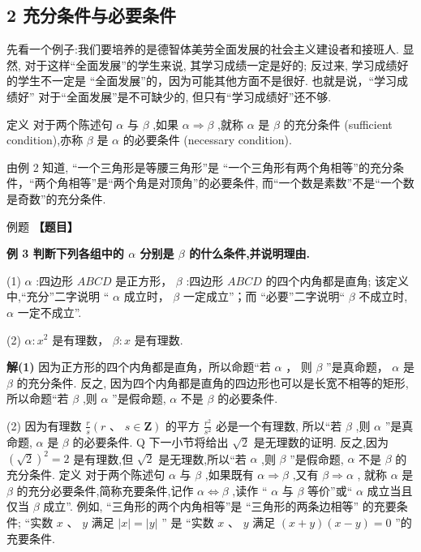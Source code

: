 \documentclass[a4paper,10pt,oneside,fontset=none]{ctexbook}
\newcounter{example}[chapter]
\newenvironment{example}[1][]{\begin{exBox}{例题}{#1}}{\end{exBox}}
\numberwithin{equation}{chapter}
\newenvironment{solution}{\begin{solutionBox}}{\end{solutionBox}}
\begin{document}
\subsection{2 充分条件与必要条件}

先看一个例子:我们要培养的是德智体美劳全面发展的社会主义建设者和接班人. 显然, 对于这样“全面发展”的学生来说, 其学习成绩一定是好的; 反过来, 学习成绩好的学生不一定是 “全面发展”的，因为可能其他方面不是很好. 也就是说，“学习成绩好” 对于“全面发展”是不可缺少的, 但只有“学习成绩好”还不够.

定义 对于两个陈述句 $\alpha$ 与 $\beta$ ,如果 $\alpha  \Rightarrow  \beta$ ,就称 $\alpha$ 是 $\beta$ 的充分条件 (sufficient condition),亦称 $\beta$ 是 $\alpha$ 的必要条件 (necessary condition).

由例 2 知道, “一个三角形是等腰三角形”是 “一个三角形有两个角相等”的充分条件，“两个角相等”是“两个角是对顶角”的必要条件, 而“一个数是素数”不是“一个数是奇数”的充分条件.

\begin{example}
\textbf{【题目】}\par\vspace{0.3em}
\textbf{例 3 判断下列各组中的 $\alpha$ 分别是 $\beta$ 的什么条件,并说明理由.}\par\vspace{0.3em}
\par
(1)  $\alpha$ :四边形 ${ABCD}$ 是正方形， $\beta$ :四边形 ${ABCD}$ 的四个内角都是直角;
该定义中,“充分”二字说明 “ $\alpha$ 成立时， $\beta$ 一定成立”；而 “必要”二字说明“ $\beta$ 不成立时, $\alpha$ 一定不成立”.
\par
(2)  $\alpha  : {x}^{2}$ 是有理数， $\beta  : x$ 是有理数.
\end{example}

\begin{solution}
\textbf{解(1)} 因为正方形的四个内角都是直角，所以命题“若 $\alpha$ ， 则 $\beta$ ”是真命题， $\alpha$ 是 $\beta$ 的充分条件.
反之, 因为四个内角都是直角的四边形也可以是长宽不相等的矩形,所以命题“若 $\beta$ ,则 $\alpha$ ”是假命题, $\alpha$ 不是 $\beta$ 的必要条件.
\par
(2) 因为有理数 $\frac{r}{s}\left( {r\text{ 、 }s \in  \mathbf{Z}}\right)$ 的平方 $\frac{{r}^{2}}{{s}^{2}}$ 必是一个有理数, 所以“若 $\beta$ ,则 $\alpha$ ”是真命题, $\alpha$ 是 $\beta$ 的必要条件. Q
下一小节将给出 $\sqrt{2}$ 是无理数的证明.
反之,因为 ${\left( \sqrt{2}\right) }^{2} = 2$ 是有理数,但 $\sqrt{2}$ 是无理数,所以“若 $\alpha$ ,则 $\beta$ ”是假命题, $\alpha$ 不是 $\beta$ 的充分条件.
定义 对于两个陈述句 $\alpha$ 与 $\beta$ ,如果既有 $\alpha  \Rightarrow  \beta$ ,又有 $\beta  \Rightarrow  \alpha$ , 就称 $\alpha$ 是 $\beta$ 的充分必要条件,简称充要条件,记作 $\alpha  \Leftrightarrow  \beta$ ,读作 “ $\alpha$ 与 $\beta$ 等价”或“ $\alpha$ 成立当且仅当 $\beta$ 成立”.
例如, “三角形的两个内角相等”是 “三角形的两条边相等” 的充要条件; “实数 $x\text{ 、 }y$ 满足 $\left| x\right|  = \left| y\right|$ ” 是 “实数 $x\text{ 、 }y$ 满足 $\left( {x + y}\right) \left( {x - y}\right)  = 0$ ”的充要条件.
\end{solution}
\end{document}
